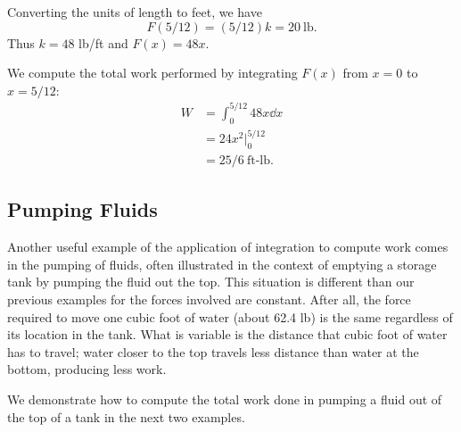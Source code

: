 \begin{example}
Converting the units of length to feet, we have
\[F(5/12) = (5/12)k = 20\ \text{lb}.\]
Thus $k = 48$ lb/ft and $F(x) = 48x$. 

We compute the total work performed by integrating $F(x)$ from $x=0$ to $x=5/12$:
\begin{align*}
	W
	&= 	\int_0^{5/12} 48x \dd x \\
	&=	24x^2\Big|_0^{5/12} \\
	&=  25/6 %
	\ \text{ft-lb.}
\end{align*}
\end{example}

\subsection{Pumping Fluids}

Another useful example of the application of integration to compute work comes in the pumping of fluids, often illustrated in the context of emptying a storage tank by pumping the fluid out the top. This situation is different than our previous examples for the forces involved are constant. After all, the force required to move one cubic foot of water (about 62.4 lb) is the same regardless of its location in the tank. What is variable is the distance that cubic foot of water has to travel; water closer to the top travels less distance than water at the bottom, producing less work.


We demonstrate how to compute the total work done in pumping a fluid out of the top of a tank in the next two examples.

